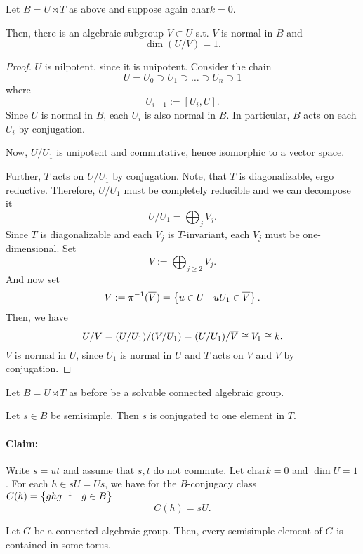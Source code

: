 \newpage

\begin{lemma}
	Let $B = U \rtimes T$ as above and suppose again $\mathrm{char} k = 0$.
	
	Then, there is an algebraic subgroup $V \subset U$ s.t. $V$ is normal in $B$ and
	\[ \dim(U/V) = 1. \]
\end{lemma}
\newpage
\begin{proof}
	$U$ is nilpotent, since it is unipotent.
	Consider the chain
	\[ U = U_0 \supset U_1 \supset \ldots \supset U_n \supset 1 \]
	where
	\[ U_{i+1} := [U_i, U]. \]
	Since $U$ is normal in $B$, each $U_i$ is also normal in $B$. In particular, $B$ acts on each $U_i$ by conjugation.
	
	Now, $U/U_1$ is unipotent and commutative, hence isomorphic to a vector space.
	
	Further, $T$ acts on $U/U_1$ by conjugation. Note, that $T$ is diagonalizable, ergo reductive. Therefore, $U/U_1$ must be completely reducible and we can decompose it
	\[ U/U_1 = \bigoplus_j V_j. \]
	Since $T$ is diagonalizable and each $V_j$ is $T$-invariant, each $V_j$ must be one-dimensional. Set
	\[ \overline{V} := \bigoplus_{j \geq 2} V_j. \]
	And now set
	\[ V := \pi^{-1}(\overline{V}) = \left\lbrace u \in U ~ | ~ uU_1 \in \overline{V}\right\rbrace. \]
	Then, we have
	\[ U/V = (U/U_1) / (V / U_1) = ( U / U_1) / \overline{V} \overset{}{\cong} V_1 \overset{}{\cong} k. \]
	$V$ is normal in $U$, since $U_1$ is normal in $U$ and $T$ acts on $V$ and $\overline{V}$ by conjugation.
\end{proof}

\newpage

\begin{theorem}
	Let $B = U \rtimes T$ as before be a solvable connected algebraic group.
	
	Let $s \in B$ be semisimple. Then $s$ is conjugated to one element in $T$.
\end{theorem}
\paragraph{Claim:} Write $s = ut$ and assume that $s,t$ do not commute. Let $\mathrm{char} k = 0$ and $\dim U = 1$. For each $h \in sU = Us$, we have for the $B$-conjugacy class $C(h) = \left\lbrace ghg^{-1} ~ | ~ g \in B\right\rbrace$
\[ C(h) = sU. \]
\begin{corollary}
	Let $G$ be a connected algebraic group. Then, every semisimple element of $G$ is contained in some torus.
\end{corollary}

